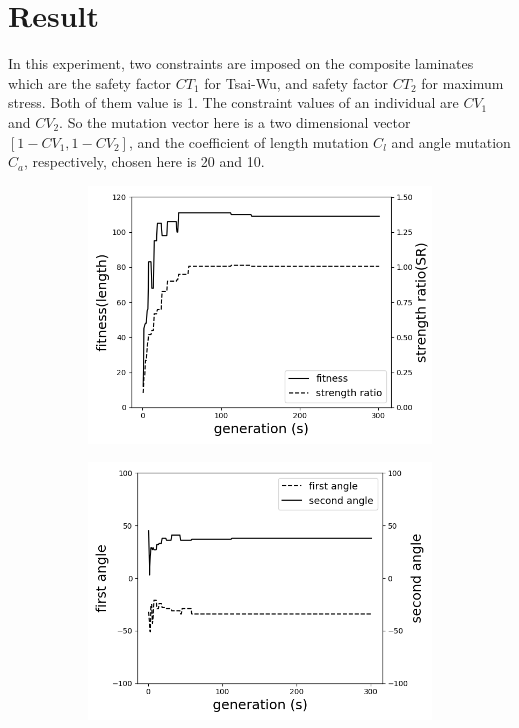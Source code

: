 \section{Result}
In this experiment, two constraints are imposed on the composite laminates which are the safety
factor $CT_1$ for Tsai-Wu, and safety factor $CT_2$ for maximum stress. Both of them value is 1. The
constraint values of an individual are $CV_1$ and $CV_2$. So the mutation vector here is a two
dimensional vector $[1 - CV_1, 1 - CV_2 ]$, and the coefficient of length mutation $C_l$ and angle mutation
$C_a$, respectively, chosen here is 20 and 10. 

\begin{figure}[!t]
	\centering
		\begin{subfigure}[b]{0.8\linewidth}
			\includegraphics[width=\linewidth]{2020-11-10-pre-image/two_distinct_angle_fitness_and_sr.png}
		\end{subfigure}

		\begin{subfigure}[b]{0.8\linewidth}
			\includegraphics[width=\linewidth]{2020-11-10-pre-image/two_distinct_angle_angle_change.png}
		\end{subfigure}


\end{figure}
